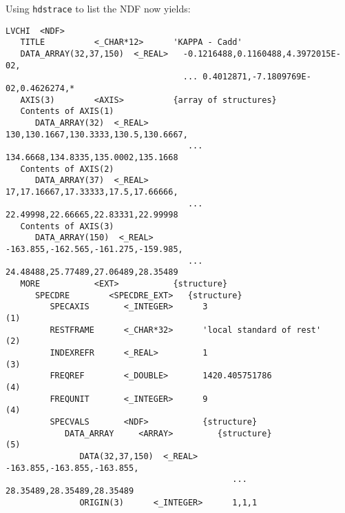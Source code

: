Using {\tt hdstrace} to list the NDF now yields:

\small
\begin{verbatim}
LVCHI  <NDF>
   TITLE          <_CHAR*12>      'KAPPA - Cadd'
   DATA_ARRAY(32,37,150)  <_REAL>   -0.1216488,0.1160488,4.3972015E-02,
                                    ... 0.4012871,-7.1809769E-02,0.4626274,*
   AXIS(3)        <AXIS>          {array of structures}
   Contents of AXIS(1)
      DATA_ARRAY(32)  <_REAL>        130,130.1667,130.3333,130.5,130.6667,
                                     ... 134.6668,134.8335,135.0002,135.1668
   Contents of AXIS(2)
      DATA_ARRAY(37)  <_REAL>        17,17.16667,17.33333,17.5,17.66666,
                                     ... 22.49998,22.66665,22.83331,22.99998
   Contents of AXIS(3)
      DATA_ARRAY(150)  <_REAL>       -163.855,-162.565,-161.275,-159.985,
                                     ... 24.48488,25.77489,27.06489,28.35489
   MORE           <EXT>           {structure}
      SPECDRE        <SPECDRE_EXT>   {structure}
         SPECAXIS       <_INTEGER>      3                                   (1)
         RESTFRAME      <_CHAR*32>      'local standard of rest'            (2)
         INDEXREFR      <_REAL>         1                                   (3)
         FREQREF        <_DOUBLE>       1420.405751786                      (4)
         FREQUNIT       <_INTEGER>      9                                   (4)
         SPECVALS       <NDF>           {structure}
            DATA_ARRAY     <ARRAY>         {structure}                      (5)
               DATA(32,37,150)  <_REAL>       -163.855,-163.855,-163.855,
                                              ... 28.35489,28.35489,28.35489
               ORIGIN(3)      <_INTEGER>      1,1,1
 

\end{verbatim}
